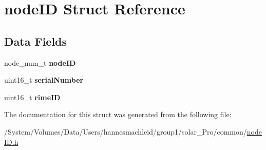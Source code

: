 \hypertarget{structnode_i_d}{}\section{node\+ID Struct Reference}
\label{structnode_i_d}
\subsection*{Data Fields}
\begin{DoxyCompactItemize}
\item 
\mbox{\label{structnode_i_d_ad1e6e71835bdf44603afad09a177ed3f}} 
node\+\_\+num\+\_\+t {\bfseries node\+ID}
\item 
\mbox{\label{structnode_i_d_a858470b159d0fc4270e0636d6fd12ba0}} 
uint16\+\_\+t {\bfseries serial\+Number}
\item 
\mbox{\label{structnode_i_d_a65f5433b1e00018cf034004b60ec08f3}} 
uint16\+\_\+t {\bfseries rime\+ID}
\end{DoxyCompactItemize}


The documentation for this struct was generated from the following file\+:\begin{DoxyCompactItemize}
\item 
/\+System/\+Volumes/\+Data/\+Users/hannesmachleid/group1/solar\+\_\+\+Pro/common/\mbox{\hyperlink{node_i_d_8h}{node\+I\+D.\+h}}\end{DoxyCompactItemize}
